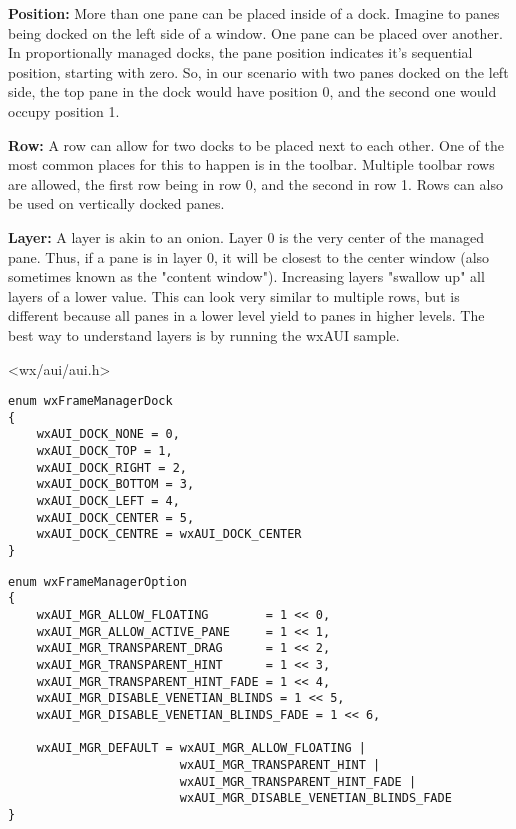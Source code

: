 {\bf Position:}
More than one pane can be placed inside of a dock. Imagine to panes
being docked on the left side of a window. One pane can be placed over
another. In proportionally managed docks, the pane position indicates
it's sequential position, starting with zero. So, in our scenario with
two panes docked on the left side, the top pane in the dock would have
position 0, and the second one would occupy position 1.

{\bf Row:}
A row can allow for two docks to be placed next to each other. One of
the most common places for this to happen is in the toolbar. Multiple
toolbar rows are allowed, the first row being in row 0, and the second
in row 1. Rows can also be used on vertically docked panes.


{\bf Layer:}
A layer is akin to an onion. Layer 0 is the very center of the
managed pane. Thus, if a pane is in layer 0, it will be closest to the
center window (also sometimes known as the "content window").
Increasing layers "swallow up" all layers of a lower value. This can
look very similar to multiple rows, but is different because all panes
in a lower level yield to panes in higher levels. The best way to
understand layers is by running the wxAUI sample.




<wx/aui/aui.h>




\begin{verbatim}
enum wxFrameManagerDock
{
    wxAUI_DOCK_NONE = 0,
    wxAUI_DOCK_TOP = 1,
    wxAUI_DOCK_RIGHT = 2,
    wxAUI_DOCK_BOTTOM = 3,
    wxAUI_DOCK_LEFT = 4,
    wxAUI_DOCK_CENTER = 5,
    wxAUI_DOCK_CENTRE = wxAUI_DOCK_CENTER
}
\end{verbatim}

\begin{verbatim}
enum wxFrameManagerOption
{
    wxAUI_MGR_ALLOW_FLOATING        = 1 << 0,
    wxAUI_MGR_ALLOW_ACTIVE_PANE     = 1 << 1,
    wxAUI_MGR_TRANSPARENT_DRAG      = 1 << 2,
    wxAUI_MGR_TRANSPARENT_HINT      = 1 << 3,
    wxAUI_MGR_TRANSPARENT_HINT_FADE = 1 << 4,
    wxAUI_MGR_DISABLE_VENETIAN_BLINDS = 1 << 5,
    wxAUI_MGR_DISABLE_VENETIAN_BLINDS_FADE = 1 << 6,

    wxAUI_MGR_DEFAULT = wxAUI_MGR_ALLOW_FLOATING |
                        wxAUI_MGR_TRANSPARENT_HINT |
                        wxAUI_MGR_TRANSPARENT_HINT_FADE |
                        wxAUI_MGR_DISABLE_VENETIAN_BLINDS_FADE
}
\end{verbatim}


